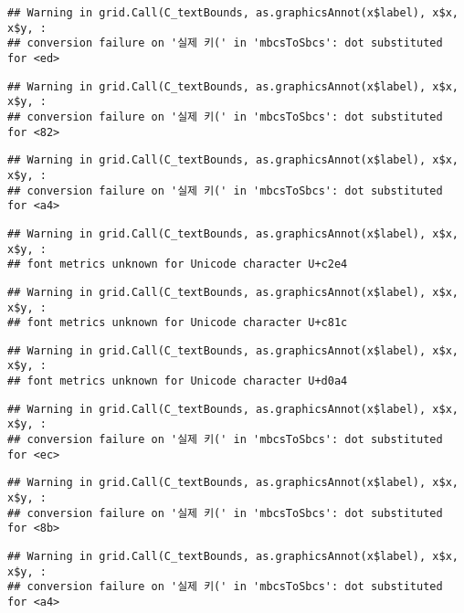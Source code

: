 \documentclass[]{book}
\begin{document}
\begin{verbatim}
## Warning in grid.Call(C_textBounds, as.graphicsAnnot(x$label), x$x, x$y, :
## conversion failure on '실제 키(' in 'mbcsToSbcs': dot substituted for <ed>
\end{verbatim}

\begin{verbatim}
## Warning in grid.Call(C_textBounds, as.graphicsAnnot(x$label), x$x, x$y, :
## conversion failure on '실제 키(' in 'mbcsToSbcs': dot substituted for <82>
\end{verbatim}

\begin{verbatim}
## Warning in grid.Call(C_textBounds, as.graphicsAnnot(x$label), x$x, x$y, :
## conversion failure on '실제 키(' in 'mbcsToSbcs': dot substituted for <a4>
\end{verbatim}

\begin{verbatim}
## Warning in grid.Call(C_textBounds, as.graphicsAnnot(x$label), x$x, x$y, :
## font metrics unknown for Unicode character U+c2e4
\end{verbatim}

\begin{verbatim}
## Warning in grid.Call(C_textBounds, as.graphicsAnnot(x$label), x$x, x$y, :
## font metrics unknown for Unicode character U+c81c
\end{verbatim}

\begin{verbatim}
## Warning in grid.Call(C_textBounds, as.graphicsAnnot(x$label), x$x, x$y, :
## font metrics unknown for Unicode character U+d0a4
\end{verbatim}

\begin{verbatim}
## Warning in grid.Call(C_textBounds, as.graphicsAnnot(x$label), x$x, x$y, :
## conversion failure on '실제 키(' in 'mbcsToSbcs': dot substituted for <ec>
\end{verbatim}

\begin{verbatim}
## Warning in grid.Call(C_textBounds, as.graphicsAnnot(x$label), x$x, x$y, :
## conversion failure on '실제 키(' in 'mbcsToSbcs': dot substituted for <8b>
\end{verbatim}

\begin{verbatim}
## Warning in grid.Call(C_textBounds, as.graphicsAnnot(x$label), x$x, x$y, :
## conversion failure on '실제 키(' in 'mbcsToSbcs': dot substituted for <a4>
\end{verbatim}
\end{document}

